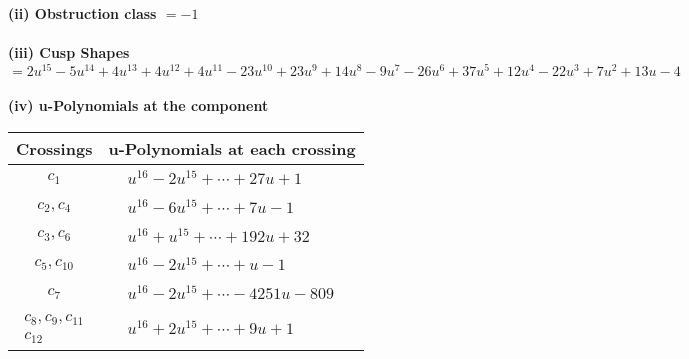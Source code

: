 \documentclass[1p]{elsarticle_modified}
\theoremstyle{definition}
\begin{document}
\flushleft \textbf{(ii) Obstruction class $= -1$}\\~\\
\flushleft \textbf{(iii) Cusp Shapes $= 2 u^{15}-5 u^{14}+4 u^{13}+4 u^{12}+4 u^{11}-23 u^{10}+23 u^9+14 u^8-9 u^7-26 u^6+37 u^5+12 u^4-22 u^3+7 u^2+13 u-4$}\\~\\
\newpage\renewcommand{\arraystretch}{1}
\flushleft \textbf{(iv) u-Polynomials at the component}\newline \\
\begin{tabular}{m{50pt}|m{274pt}}
Crossings & \hspace{64pt}u-Polynomials at each crossing \\
\hline $$\begin{aligned}c_{1}\end{aligned}$$&$\begin{aligned}
&u^{16}-2 u^{15}+\cdots+27 u+1
\end{aligned}$\\
\hline $$\begin{aligned}c_{2},c_{4}\end{aligned}$$&$\begin{aligned}
&u^{16}-6 u^{15}+\cdots+7 u-1
\end{aligned}$\\
\hline $$\begin{aligned}c_{3},c_{6}\end{aligned}$$&$\begin{aligned}
&u^{16}+u^{15}+\cdots+192 u+32
\end{aligned}$\\
\hline $$\begin{aligned}c_{5},c_{10}\end{aligned}$$&$\begin{aligned}
&u^{16}-2 u^{15}+\cdots+u-1
\end{aligned}$\\
\hline $$\begin{aligned}c_{7}\end{aligned}$$&$\begin{aligned}
&u^{16}-2 u^{15}+\cdots-4251 u-809
\end{aligned}$\\
\hline $$\begin{aligned}c_{8},c_{9},c_{11}\\c_{12}\end{aligned}$$&$\begin{aligned}
&u^{16}+2 u^{15}+\cdots+9 u+1
\end{aligned}$\\
\hline
\end{tabular}\\~\\
\end{document}
